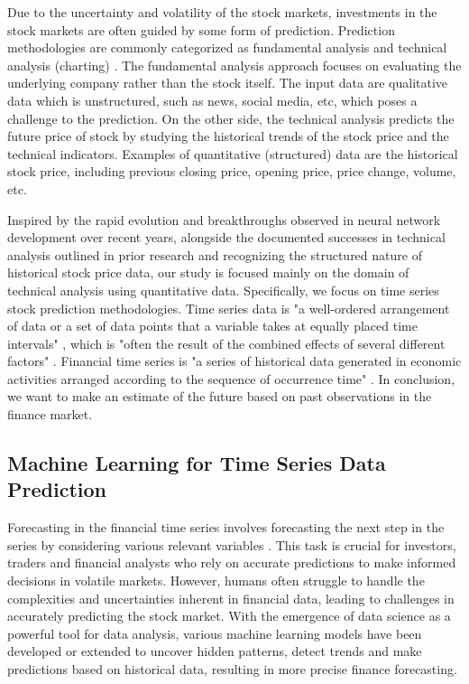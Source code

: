 \documentclass{article}
\begin{document}
Due to the uncertainty and volatility of the stock markets, investments in the stock markets are often guided by some form of prediction. Prediction methodologies are commonly categorized as fundamental analysis and technical analysis (charting) \citep{attigeri2015stock, nti2020systematic, ican2017stock, li2015tensor}. The fundamental analysis approach focuses on evaluating the underlying company rather than the stock itself. The input data are qualitative data which is unstructured, such as news, social media, etc, which poses a challenge to the prediction. On the other side, the technical analysis predicts the future price of stock by studying the historical trends of the stock price and the technical indicators. Examples of quantitative (structured) data are the historical stock price, including previous closing price, opening price, price change, volume, etc. 

Inspired by the rapid evolution and breakthroughs observed in neural network development over recent years, alongside the documented successes in technical analysis outlined in prior research \citep{li2020stock} and recognizing the structured nature of historical stock price data, our study is focused mainly on the domain of technical analysis using quantitative data. Specifically, we focus on time series stock prediction methodologies. Time series data is "a well-ordered arrangement of data or a set of data points that a variable takes at equally placed time intervals" \citep{idrees2019prediction}, which is "often the result of the combined effects of several different factors" \citep{cao2019stock}. Financial time series is "a series of historical data generated in economic activities arranged according to the sequence of occurrence time" \citep{cao2019stock}. In conclusion, we want to make an estimate of the future based on past observations in the finance market.

\subsection{Machine Learning for Time Series Data Prediction}

Forecasting in the financial time series involves forecasting the next step in the series by considering various relevant variables \citep{ican2017stock}. This task is crucial for investors, traders and financial analysts who rely on accurate predictions to make informed decisions in volatile markets. However, humans often struggle to handle the complexities and uncertainties inherent in financial data, leading to challenges in accurately predicting the stock market. With the emergence of data science as a powerful tool for data analysis, various machine learning models have been developed or extended to uncover hidden patterns, detect trends and make predictions based on historical data, resulting in more precise finance forecasting. 
\end{document}
